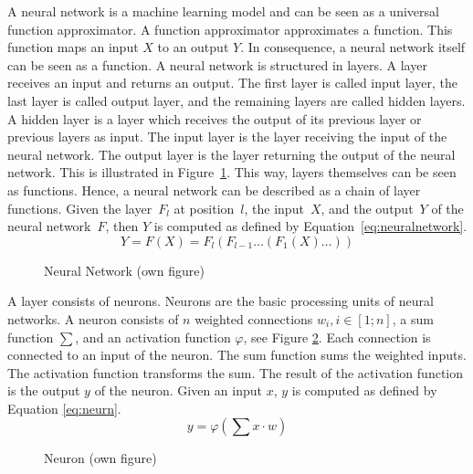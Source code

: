 A neural network is a machine learning model and can be seen as a universal function approximator. A function approximator approximates a function. This function maps an input $X$ to an output $Y$.\autocites{Hornik.1989}{Ertel.2016}
In consequence, a neural network itself can be seen as a function. 
A neural network is structured in layers. \autocite{Ertel.2016}  A layer receives an input and returns an output. The first layer is called input layer, the last layer is called output layer, and the remaining layers are called hidden layers. \autocite{LeCun.2015b} A hidden layer is a layer which receives the output of its previous layer or previous layers as input. The input layer is the layer receiving the input of the neural network. The output layer is the layer returning the output of the neural network. This is illustrated in Figure~\ref{img:neuralnetwork}.
This way, layers themselves can be seen as functions. Hence, a neural network can be described as a chain of layer functions. Given the layer~$F_l$ at position~$l$, the input~$X$, and the output~$Y$ of the neural network~$F$, then $Y$ is computed as defined by Equation~\eqref{eq:neuralnetwork}.
\begin{equation}
	\label{eq:neuralnetwork}
	Y = F(X) = F_l(F_{l-1}\dots(F_1(X)\dots)) 
\end{equation}
\begin{figure}[H]
	\centering
	
	\caption{Neural Network (own figure)} \label{img:neuralnetwork}
\end{figure}
A layer consists of neurons. Neurons are the basic processing units of neural networks. A neuron consists of $n$ weighted connections $w_i, i \in [1;n]$, a sum function $\sum$, and an activation function $\varphi$, see Figure \ref{img:neuron}. Each connection is connected to an input of the neuron. The sum function sums the weighted inputs. The activation function transforms the sum. The result of the activation function is the output $y$ of the neuron. \autocite{Ertel.2016} Given an input $x$, $y$ is computed as defined by Equation \eqref{eq:neurn}.
\begin{equation}
	\label{eq:neurn}
	y = \varphi(\sum x \cdot w)
\end{equation}
\begin{figure}[H]
	\centering
	
	\caption{Neuron (own figure)} \label{img:neuron}
\end{figure}
